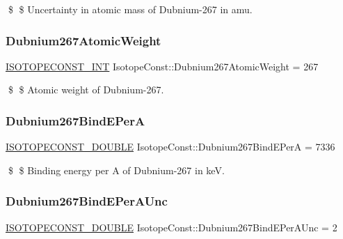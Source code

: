 \$ \$ Uncertainty in atomic mass of Dubnium-\/267 in amu. \mbox{\label{group___isotope_const-_dubnium-_db267_ga4eb2ecabf0a512360b8ba94e8392e599}} 
\subsubsection{\texorpdfstring{Dubnium267\+Atomic\+Weight}{Dubnium267AtomicWeight}}
{\footnotesize\ttfamily \mbox{\hyperlink{group___isotope_const-_macros_ga5f18360b3e99483a35c32d789e62621c}{I\+S\+O\+T\+O\+P\+E\+C\+O\+N\+S\+T\+\_\+\+I\+NT}} Isotope\+Const\+::\+Dubnium267\+Atomic\+Weight = 267}

\$ \$ Atomic weight of Dubnium-\/267. \mbox{\label{group___isotope_const-_dubnium-_db267_gae11474d210766ee2884361e28e6054ae}} 
\subsubsection{\texorpdfstring{Dubnium267\+Bind\+E\+PerA}{Dubnium267BindEPerA}}
{\footnotesize\ttfamily \mbox{\hyperlink{group___isotope_const-_macros_ga8f45a7272ce02c0b4c65c44636ed719a}{I\+S\+O\+T\+O\+P\+E\+C\+O\+N\+S\+T\+\_\+\+D\+O\+U\+B\+LE}} Isotope\+Const\+::\+Dubnium267\+Bind\+E\+PerA = 7336}

\$ \$ Binding energy per A of Dubnium-\/267 in keV. \mbox{\label{group___isotope_const-_dubnium-_db267_gae739b1ed19a9bf71e1e7c33ed84ebbf7}} 
\subsubsection{\texorpdfstring{Dubnium267\+Bind\+E\+Per\+A\+Unc}{Dubnium267BindEPerAUnc}}
{\footnotesize\ttfamily \mbox{\hyperlink{group___isotope_const-_macros_ga8f45a7272ce02c0b4c65c44636ed719a}{I\+S\+O\+T\+O\+P\+E\+C\+O\+N\+S\+T\+\_\+\+D\+O\+U\+B\+LE}} Isotope\+Const\+::\+Dubnium267\+Bind\+E\+Per\+A\+Unc = 2}


